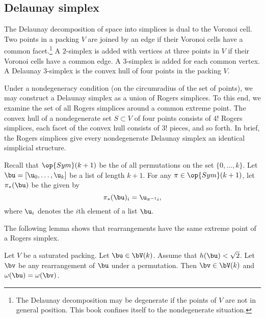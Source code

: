 \subsection{Delaunay simplex}

The Delaunay decomposition of space into simplices is dual to the
Voronoi cell.  Two points in a packing $V$ are joined by an edge if
their Voronoi cells have a common facet.\footnote{The Delaunay
  decomposition may be degenerate if the points of $V$ are not in
  general position.  This book confines itself to the nondegenerate
  situation.}  A $2$-simplex is added with vertices at three points in
$V$ if their Voronoi cells have a common edge.  A $3$-simplex is added
for each common vertex.  A Delaunay $3$-simplex is the convex hull of
four points in the packing $V$.

Under a nondegeneracy condition (on the circumradius of the set of
points), we may construct a Delaunay simplex as a union of Rogers
simplices.  To this end, we examine the set of all Rogers simplices
around a common extreme point.  The convex hull of a nondegenerate set
$S\subset V$ of four points consists of $4!$ Rogers simplices,  each
facet of the convex hull consists of $3!$ pieces,  and so
forth.  In brief, the Rogers simplices give every nondegenerate
Delaunay simplex an identical simplicial structure.


Recall that $\op{Sym}(k+1)$ be the  of all permutations on the
set $\{0,\ldots,k\}$.  Let $\bu = [\u_0,\ldots, \u_k]$ be a list of
length $k+1$.  For any  $\pi\in\op{Sym}(k+1)$,
let $\pi_*(\bu)$ be the  given by
\[  
\pi_*(\bu)_i =  \u_{\pi^{-1} i}, %
\]    
where $\u_i$ denotes the $i$th element of a list $\bu$.
%
%

The following lemma shows that rearrangements have the same extreme
point of a Rogers simplex.

\begin{lemma}   
\label{lemma:perm-Vk} 
  Let $V$ be a saturated packing.  Let $\bu\in \bV(k)$.  Assume that
  $h(\bu)<\sqrt2$. Let $\bv$ be any rearrangement of $\bu$ under a
  permutation.  Then $\bv\in \bV(k)$ and $\omega(\bu) = \omega(\bv)$.
\end{lemma}

